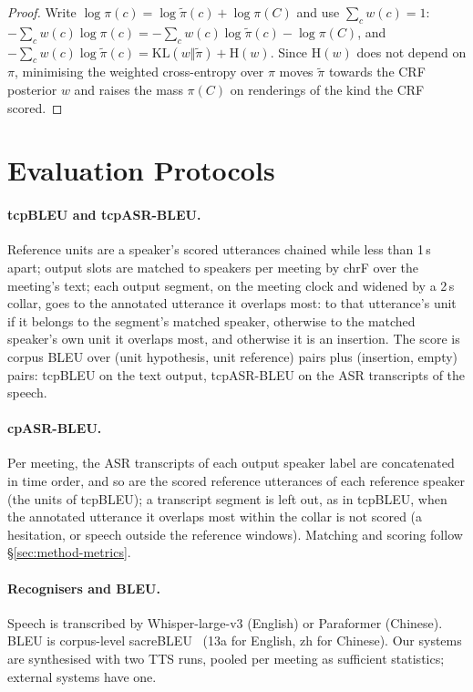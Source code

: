 \begin{proof}
Write $\log\pi(c)=\log\tilde{\pi}(c)+\log\pi(C)$ and use $\sum_cw(c)=1$:
$-\sum_cw(c)\log\pi(c)=-\sum_cw(c)\log\tilde{\pi}(c)-\log\pi(C)$, and
$-\sum_cw(c)\log\tilde{\pi}(c)=\mathrm{KL}(w\Vert\tilde{\pi})+\mathrm{H}(w)$.
Since $\mathrm{H}(w)$ does not depend on $\pi$, minimising the weighted cross-entropy over $\pi$ moves $\tilde{\pi}$
towards the CRF posterior $w$ and raises the mass $\pi(C)$ on renderings of the kind the CRF scored.
\end{proof}

\section{Evaluation Protocols}
\label{app:eval}
\label{app:metrics}
\label{app:prereg}

\paragraph{tcpBLEU and tcpASR-BLEU.} Reference units are a speaker's scored utterances chained while less than 1\,s
apart; output slots are matched to speakers per meeting by chrF over the meeting's text; each output segment, on the
meeting clock and widened by a 2\,s collar, goes to the annotated utterance it overlaps most: to that utterance's unit if
it belongs to the segment's matched speaker, otherwise to the matched speaker's own unit it overlaps most, and otherwise
it is an insertion. The score is corpus BLEU over (unit hypothesis, unit reference) pairs plus (insertion, empty) pairs:
tcpBLEU on the text output, tcpASR-BLEU on the ASR transcripts of the speech.

\paragraph{cpASR-BLEU.} Per meeting, the ASR transcripts of each output speaker label are concatenated in time order,
and so are the scored reference utterances of each reference speaker (the units of tcpBLEU); a transcript segment is
left out, as in tcpBLEU, when the annotated utterance it overlaps most within the collar is not scored (a hesitation,
or speech outside the reference windows). Matching and scoring follow \S\ref{sec:method-metrics}.

\paragraph{Recognisers and BLEU.} Speech is transcribed by Whisper-large-v3 (English) or Paraformer (Chinese). BLEU is
corpus-level sacreBLEU~\citep{post2018call} (13a for English, zh for Chinese). Our systems are synthesised with two TTS
runs, pooled per meeting as sufficient statistics; external systems have one.

